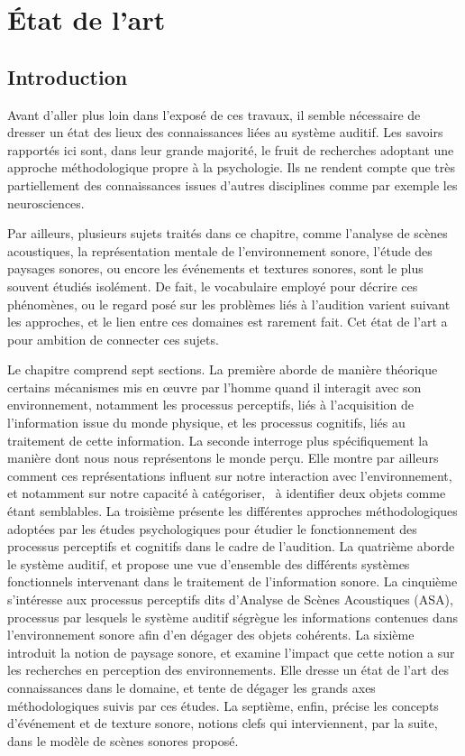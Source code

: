 \chapter{État de l'art}\label{ch:psycho_ea}

\section{Introduction}

Avant d'aller plus loin dans l'exposé de ces travaux, il semble nécessaire de dresser un état des lieux des connaissances liées au système auditif. Les savoirs rapportés ici sont, dans leur grande majorité, le fruit de recherches adoptant une approche méthodologique propre à la psychologie. Ils ne rendent compte que très partiellement des connaissances issues d'autres disciplines comme par exemple les neurosciences.

Par ailleurs, plusieurs sujets traités dans ce chapitre, comme l'analyse de scènes acoustiques, la représentation mentale de l'environnement sonore, l'étude des paysages sonores, ou encore les événements et textures sonores, sont le plus souvent étudiés isolément. De fait, le vocabulaire employé pour décrire ces phénomènes, ou le regard posé sur les problèmes liés à l'audition varient suivant les approches, et le lien entre ces domaines est rarement fait. Cet état de l'art a pour ambition de connecter ces sujets.

Le chapitre comprend sept sections. La première aborde de manière théorique certains mécanismes mis en œuvre par l'homme quand il interagit avec son environnement, notamment les processus perceptifs, liés à l'acquisition de l'information issue du monde physique, et les processus cognitifs, liés au traitement de cette information. La seconde interroge plus spécifiquement la manière dont nous nous représentons le monde perçu. Elle montre par ailleurs comment ces représentations influent sur notre interaction avec l'environnement, et notamment sur notre capacité à catégoriser, \ie~à identifier deux objets comme étant semblables. La troisième présente les différentes approches méthodologiques adoptées par les études psychologiques pour étudier le fonctionnement des processus perceptifs et cognitifs dans le cadre de l'audition. La quatrième aborde le système auditif, et propose une vue d'ensemble des différents systèmes fonctionnels intervenant dans le traitement de l'information sonore. La cinquième s'intéresse aux processus perceptifs dits d'Analyse de Scènes Acoustiques (ASA), processus par lesquels le système auditif ségrègue les informations contenues dans l'environnement sonore afin d'en dégager des objets cohérents. La sixième introduit la notion de paysage sonore, et examine l'impact que cette notion a sur les recherches en perception des environnements. Elle dresse un état de l'art des connaissances dans le domaine, et tente de dégager les grands axes méthodologiques suivis par ces études. La septième, enfin, précise les concepts d'événement et de texture sonore, notions clefs qui interviennent, par la suite, dans le modèle de scènes sonores proposé.

